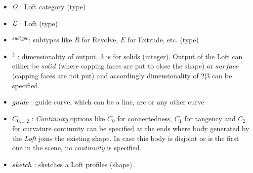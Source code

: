		\begin{itemize}[noitemsep,topsep=0pt,parsep=0pt,partopsep=0pt]
		\item 	\textcolor{black}{$\Omega$} : Loft category (type)
	     	\item 	\textcolor{black}{${\bf \mathcal{L}}$} : Loft (type)
		\item  	\textcolor{black}{$^{subtype}$}: subtypes like $R$ for Revolve, $E$ for Extrude, etc. (type)
		 \item 	\textcolor{black}{$^3$} : dimensionality of output, $3$ is for solids (integer).  Output of the Loft can either be $solid$ (where capping faces are put to close the shape) or $surface$ (capping faces are not put) and accordingly dimensionality of $2|3$ can be specified.
  		\item  	\textcolor{black}{$guide$} : guide curve, which can be a line, arc or any other curve
		 \item  	\textcolor{black}{$C_{0,1,2}$} : {\em Continuity} options like $C_0$ for connectedness, $C_1$ for tangency and $C_2$ for curvature continuity can be specified at the ends where body generated by the {\em Loft} joins the existing shape. In case this body is disjoint or is the first one in the scene, no {\em continuity}  is specified.
		 \item  	\textcolor{black}{$sketch$} : sketches a Loft profiles (shape). 
		\end{itemize}

		

